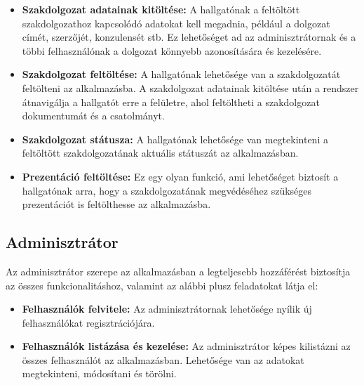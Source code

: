 \begin{itemize}

\item \textbf{Szakdolgozat adatainak kitöltése:} A hallgatónak a feltöltött szakdolgozathoz kapcsolódó adatokat kell megadnia, például a dolgozat címét, szerzőjét, konzulensét stb. Ez lehetőséget ad az adminisztrátornak és a többi felhasználónak a dolgozat könnyebb azonosítására és kezelésére.

\item \textbf{Szakdolgozat feltöltése:} A hallgatónak lehetősége van a szakdolgozatát feltölteni az alkalmazásba. A szakdolgozat adatainak kitöltése után a rendszer átnavigálja a hallgatót erre a felületre, ahol feltöltheti a szakdolgozat dokumentumát és a csatolmányt.

\item \textbf{Szakdolgozat státusza:} A hallgatónak lehetősége van megtekinteni a feltöltött szakdolgozatának aktuális státuszát az alkalmazásban. 

\item \textbf{Prezentáció feltöltése:} Ez egy olyan funkció, ami lehetőséget biztosít a hallgatónak arra, hogy a szakdolgozatának megvédéséhez szükséges prezentációt is feltölthesse az alkalmazásba.


\end{itemize}


\subsection{Adminisztrátor}

Az adminisztrátor szerepe az alkalmazásban a legteljesebb hozzáférést biztosítja az összes funkcionalitáshoz, valamint az alábbi plusz feladatokat látja el:

\begin{itemize}

\item \textbf{Felhasználók felvitele:} Az adminisztrátornak lehetősége nyílik új felhasználókat regisztrációjára.

\item \textbf{Felhasználók listázása és kezelése:} Az adminisztrátor képes kilistázni az összes felhasználót az alkalmazásban. Lehetősége van az adatokat megtekinteni, módosítani és törölni.

\end{itemize}
